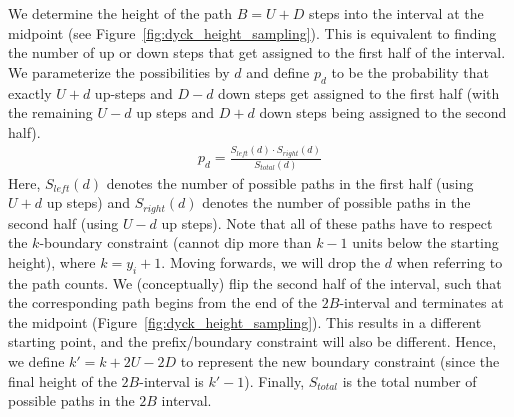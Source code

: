 We determine the height of the path $B = U+D$ steps into the interval at the midpoint (see Figure~\ref{fig:dyck_height_sampling}).
This is equivalent to finding the number of up or down steps that get assigned to the first half of the interval.
We parameterize the possibilities by $d$ and define $p_d$ to be the probability that exactly $U+d$ up-steps and $D-d$ down steps
get assigned to the first half (with the remaining $U-d$ up steps and $D+d$ down steps being assigned to the second half).
\begin{align}
\label{eq:height_sampling_probability}
p_d = \frac{S_{left}(d)\cdot S_{right}(d)}{S_{total}(d)}
\end{align}
Here, $S_{left}(d)$ denotes the number of possible paths in the first half (using $U+d$ up steps)
and $S_{right}(d)$ denotes the number of possible paths in the second half (using $U-d$ up steps).
Note that all of these paths have to respect the $k$-boundary constraint (cannot dip more than $k-1$ units below the starting height), where $k=y_i+1$.
Moving forwards, we will drop the $d$ when referring to the path counts.
We (conceptually) flip the second half of the interval,
such that the corresponding path begins from the end of the $2B$-interval and terminates at the midpoint (Figure~\ref{fig:dyck_height_sampling}).
This results in a different starting point, and the prefix/boundary constraint will also be different.
Hence, we define $k' = k + 2U - 2D$  to represent the new boundary constraint (since the final height of the $2B$-interval is $k'-1$).
Finally, $S_{total}$ is the total number of possible paths in the $2B$ interval.

